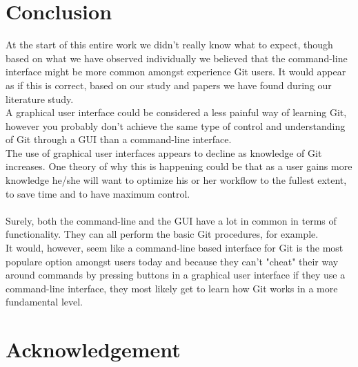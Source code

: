 \documentclass[a4paper,oneside]{bth} %
\begin{document}
		
		\chapter{Conclusion}
		At the start of this entire work we didn't really know what to expect, though based on what we have observed individually we believed that the command-line interface might be more common amongst experience Git users.
		It would appear as if this is correct, based on our study and papers we have found during our literature study.
		\\A graphical user interface could be considered a less painful way of learning Git, however you probably don't achieve the same type of control and understanding of Git through a GUI than a command-line interface.
		\\The use of graphical user interfaces appears to decline as knowledge of Git increases.
		One theory of why this is happening could be that as a user gains more knowledge he/she will want to optimize his or her workflow to the fullest extent, to save time and to have maximum control.
		\\\\Surely, both the command-line and the GUI have a lot in common in terms of functionality. They can all perform the basic Git procedures, for example.
		\\It would, however, seem like a command-line based interface for Git is the most populare option amongst users today and because they can't "cheat" their way around commands by pressing buttons in a graphical user interface if they use a command-line interface, they most likely get to learn how Git works in a more fundamental level.
		
		
		
		
		\chapter*{Acknowledgement}
		
\end{document}
